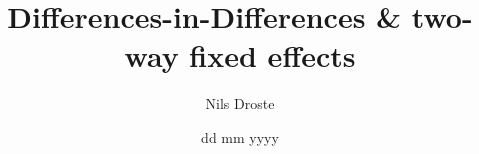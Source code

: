 \documentclass[aspectratio=169]{beamer}
\title[Causal Inference]{Differences-in-Differences \& \newline two-way fixed effects}
\author{Nils Droste}
\subtitle{}
\date{dd mm yyyy}
\institute{Lund University\\Department for Political Science}
\begin{document}

\titleframe



\end{document}
